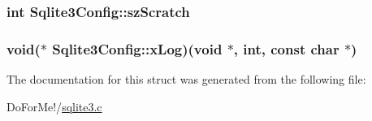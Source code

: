 \hypertarget{struct_sqlite3_config_aed5cee0c084b3298b4f15debdab90272}{
\subsubsection[{sz\-Scratch}]{\setlength{\rightskip}{0pt plus 5cm}int Sqlite3\-Config\-::sz\-Scratch}}\label{struct_sqlite3_config_aed5cee0c084b3298b4f15debdab90272}
\hypertarget{struct_sqlite3_config_a59bd59da6676dc62f9acdd6ff6d27d82}{
\subsubsection[{x\-Log}]{\setlength{\rightskip}{0pt plus 5cm}void($\ast$ Sqlite3\-Config\-::x\-Log)(void $\ast$, int, const char $\ast$)}}\label{struct_sqlite3_config_a59bd59da6676dc62f9acdd6ff6d27d82}


The documentation for this struct was generated from the following file\-:\begin{DoxyCompactItemize}
\item 
Do\-For\-Me!/\hyperlink{sqlite3_8c}{sqlite3.\-c}\end{DoxyCompactItemize}
